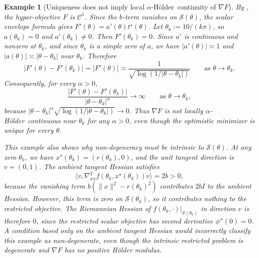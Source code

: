 \documentclass{article}
\theoremstyle{normaltheorem}
\newtheorem{example}[example]{Example}
\newcommand{\calS}{\mathcal{S}}
\newcommand{\holder}{{H\"older}}
\begin{document}
\begin{example}[Uniqueness does not imply local \texorpdfstring{$\alpha$}{alpha}-\holder\ continuity of $\nabla F$]
By , the hyper-objective $F$ is $\mathcal C^1$. Since the \(b\)-term vanishes on \(\calS(\theta)\), the scalar envelope formula gives $F'(\theta)=a'(\theta)t^\star(\theta)$. Let $\theta_k:=10/(k\pi)$, so $a(\theta_k)=0$ and $a'(\theta_k)\neq 0$. Then $F'(\theta_k)=0$. Since \(a'\) is continuous and nonzero at \(\theta_k\), and since \(\theta_k\) is a simple zero of \(a\), we have \(|a'(\theta)|\asymp1\) and \(|a(\theta)|\asymp|\theta-\theta_k|\) near \(\theta_k\). Therefore
\[
|F'(\theta)-F'(\theta_k)|
=|F'(\theta)|
\asymp
\frac{1}{\sqrt{\log(1/|\theta-\theta_k|)}}
\qquad\text{as }\theta\to\theta_k.
\]
Consequently, for every $\alpha>0$,
\[
\frac{|F'(\theta)-F'(\theta_k)|}{|\theta-\theta_k|^\alpha}\to\infty
\qquad\text{as }\theta\to\theta_k,
\]
because $|\theta-\theta_k|^\alpha\sqrt{\log(1/|\theta-\theta_k|)}\to 0$. Thus $\nabla F$ is not locally $\alpha$-\holder\ continuous near $\theta_k$ for any $\alpha>0$, even though the optimistic minimizer is unique for every $\theta$.

This example also shows why non-degeneracy must be intrinsic to \(\calS(\theta)\). At any zero \(\theta_k\), we have \(x^\star(\theta_k)=(r(\theta_k),0)\), and the unit tangent direction is \(v=(0,1)\). The ambient tangent Hessian satisfies
\[
\big\langle v,\nabla^2_{xx}f(\theta_k,x^\star(\theta_k))v\big\rangle=2b>0,
\]
because the vanishing term \(b(\|x\|^2-r(\theta_k)^2)\) contributes \(2bI\) to the ambient Hessian. However, this term is zero on \(\calS(\theta_k)\), so it contributes nothing to the restricted objective. The Riemannian Hessian of \(f(\theta_k,\cdot)|_{\calS(\theta_k)}\) in direction \(v\) is therefore \(0\), since the restricted scalar objective has second derivative \(\phi''(0)=0\). A condition based only on the ambient tangent Hessian would incorrectly classify this example as non-degenerate, even though the intrinsic restricted problem is degenerate and \(\nabla F\) has no positive H\"older modulus.
\end{example}
\end{document}
